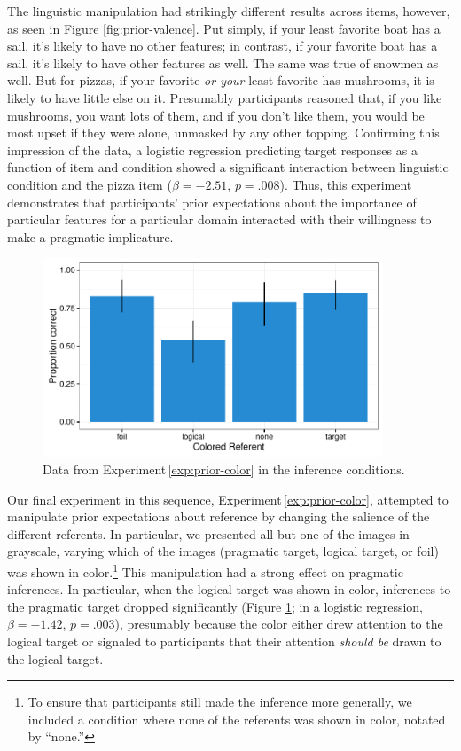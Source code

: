 \documentclass[man,noapacite]{apa2}
\newcounter{Experiment}
\newcommand{\exptref}[1]{Experiment\,\ref{#1}}
\begin{document}
The linguistic manipulation had strikingly different results across items, however, as seen in Figure \ref{fig:prior-valence}. Put simply, if your least favorite boat has a sail, it's likely to have no other features; in contrast, if your favorite boat has a sail, it's likely to have other features as well. The same was true of snowmen as well. But for pizzas, if your favorite \emph{or your} least favorite has mushrooms, it is likely to have little else on it. Presumably participants reasoned that, if you like mushrooms, you want lots of them, and if you don't like them, you would be most upset if they were alone, unmasked by any other topping. Confirming this impression of the data, a logistic regression predicting target responses as a function of item and condition showed a significant interaction between linguistic condition and the pizza item ($\beta = -2.51$, $p = .008$). Thus, this experiment demonstrates that participants' prior expectations about the importance of particular features for a particular domain interacted with their willingness to make a pragmatic implicature.

\begin{figure}[t]
  \centering
  \includegraphics[width=4in]{../plots/2-prior-color.pdf}
  \caption{\label{fig:prior-color} Data from \exptref{exp:prior-color} in the inference conditions.}
\end{figure}

Our final experiment in this sequence, \exptref{exp:prior-color}, attempted to manipulate prior expectations about reference by changing the salience of the different referents. In particular, we presented all but one of the images in grayscale, varying which of the images (pragmatic target, logical target, or foil) was shown in color.\footnote{To ensure that participants still made the inference more generally, we included a condition where none of the referents was shown in color, notated by ``none.''} This manipulation had a strong effect on pragmatic inferences. In particular, when the logical target was shown in color, inferences to the pragmatic target dropped significantly (Figure \ref{fig:prior-color}; in a logistic regression, $\beta = -1.42$, $p = .003$), presumably because the color either drew attention to the logical target or signaled to participants that their attention \emph{should be} drawn to the logical target.
\end{document}
